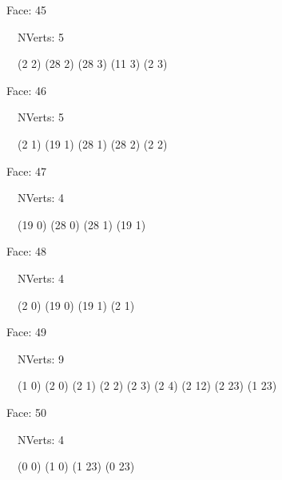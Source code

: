 \documentclass{article}
\begin{document}
{\footnotesize 

Face: 45

\   \    NVerts: 5

 \   \   (2 2) (28 2) (28 3) (11 3) (2 3)}

{\footnotesize 

Face: 46

\   \    NVerts: 5

 \   \   (2 1) (19 1) (28 1) (28 2) (2 2)}

{\footnotesize 

Face: 47

\   \    NVerts: 4

 \   \   (19 0) (28 0) (28 1) (19 1)}

{\footnotesize 

Face: 48

\   \    NVerts: 4

 \   \   (2 0) (19 0) (19 1) (2 1)}

{\footnotesize 

Face: 49

\   \    NVerts: 9

 \   \   (1 0) (2 0) (2 1) (2 2) (2 3) (2 4) (2 12) (2 23) (1 23)}

{\footnotesize 

Face: 50

\   \    NVerts: 4

 \   \   (0 0) (1 0) (1 23) (0 23)}


 \newpage
\end{document}
